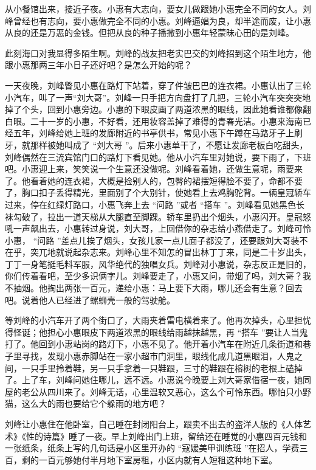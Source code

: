 \documentclass[12pt,twoside,openany]{book}
\begin{document}
从小餐馆出来，接近子夜。小惠有大志向，要女儿做跟她小惠完全不同的女人。刘峰曾经也有志向，要小惠做完全不同的小惠。刘峰逼娼为良，却半途而废，让小惠从良的还是万恶的金钱。但把从良的种子播撒到小惠年轻蒙昧心田的是刘峰。

此刻海口对我显得多陌生啊。刘峰的战友把老实巴交的刘峰招到这个陌生地方，他跟小惠那两三年小日子还好吧？是怎么开始的呢？

一天夜晚，刘峰瞥见小惠在路灯下站着，穿了件皱巴巴的连衣裙。小惠认出了三轮小汽车，叫了一声“刘大哥”。刘峰一只手把方向盘打了几把，三轮小汽车突突突地掉了个头，回到小惠旁边。小惠的下眼皮画了两道浓黑的眼线，因此她看谁都像翻白眼。二十一岁的小惠，不好看，还用妆容盖掉了难得的青春光洁。小惠来海南已经五年，刘峰给她上班的发廊附近的书亭供书，常见小惠下午蹲在马路牙子上刷牙，就那样被她叫成了 “刘大哥 ”。后来小惠单干了，不愿让发廊老板白吃甜头，刘峰偶然在三流宾馆门口的路灯下看见她。他从小汽车里对她说，要下雨了，下班吧。小惠迎上来，笑笑说一个生意还没做呢。刘峰看着她，还做生意呢，雨要来了。他看着她的连衣裙，大概是捡别人的，包臀的裙摆短得脸不要了，命都不要了，胸口扣子丢得精光，里面别了个大别针，使她看上去鸡胸驼背。一辆皇冠轿车过来，停在红绿灯路口，小惠飞奔上去 “问路 ”或者 “搭车 ”。刘峰看见她黑色长袜勾破了，拉出一道天梯从大腿直至脚踝。轿车里扔出个烟头，小惠闪开。皇冠怒吼一声飙出去，小惠转过身说，刘大哥，上回借你的杂志给小燕借走了。刘峰可怜小惠， “问路 ”差点儿挨了烟头，女孩儿家一点儿面子都没了，还要跟刘大哥装不在乎，突兀地就说起杂志来。刘峰心里不知怎的冒出林丁丁来，同是二十岁出头，丁丁一身笔挺毛料军服，风华绝代的独唱女兵。刘峰对小惠说，杂志反正是旧的，你们传着看吧，至少多识俩字儿。刘峰要走了，小惠又问，带烟了吗，刘大哥？我不抽烟。他掏出两张一百元，递给小惠：马上要下大雨，哪儿还会有生意？回去吧。说着他人已经进了螺蛳壳一般的驾驶舱。

等刘峰的小汽车开了两个街口了，大雨夹着雷电横着来了。他再次掉头，心里担忧得怪诞；他担心小惠眼皮下两道浓黑的眼线给雨越抹越黑，再 “搭车 ”要让人当鬼打了。他回到小惠站岗的路灯下，小惠不见了。他开着小汽车在附近几条街道和巷子里寻找，发现小惠赤脚站在一家小超市门洞里，眼线化成几道黑眼泪，人鬼之间，一只手里拎着鞋，另一只手拿着一只鞋跟，三寸的鞋跟在榕树的老根上磕掉了。上了车，刘峰问她住哪儿，远不远。小惠说今晚要上刘大哥家借宿一夜，她同屋的老公从四川来了。刘峰无话，心里温软又恶心，这么个可怜东西。哪怕只小野猫，这么大的雨也要给它个躲雨的地方吧？

刘峰让小惠住在他卧室，自己睡在封闭阳台上，跟卖不出去的盗洋人版的《人体艺术》《性的诗篇》睡了一夜。早上刘峰出门上班，留给还在睡觉的小惠四百元钱和一张纸条，纸条上写的几句话是小区里开办的 “寇媛美甲训练班 ”在招人，学费三百，剩的一百元够她付半月地下室房租，小区内就有人短租这种地下室。
\end{document}

